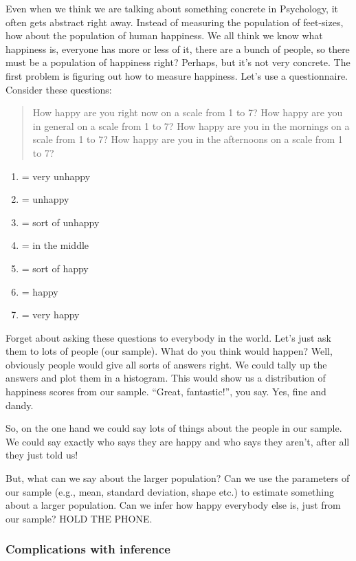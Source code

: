 \documentclass[
  letterpaper,
  DIV=11,
  numbers=noendperiod]{scrreprt}
\providecommand{\tightlist}{%
  \setlength{\itemsep}{0pt}\setlength{\parskip}{0pt}}\usepackage{longtable,booktabs,array}
\begin{document}
Even when we think we are talking about something concrete in
Psychology, it often gets abstract right away. Instead of measuring the
population of feet-sizes, how about the population of human happiness.
We all think we know what happiness is, everyone has more or less of it,
there are a bunch of people, so there must be a population of happiness
right? Perhaps, but it's not very concrete. The first problem is
figuring out how to measure happiness. Let's use a questionnaire.
Consider these questions:

\begin{quote}
How happy are you right now on a scale from 1 to 7? How happy are you in
general on a scale from 1 to 7? How happy are you in the mornings on a
scale from 1 to 7? How happy are you in the afternoons on a scale from 1
to 7?
\end{quote}

\begin{enumerate}
\def\labelenumi{\arabic{enumi}.}
\tightlist
\item
  = very unhappy
\item
  = unhappy
\item
  = sort of unhappy
\item
  = in the middle
\item
  = sort of happy
\item
  = happy
\item
  = very happy
\end{enumerate}

Forget about asking these questions to everybody in the world. Let's
just ask them to lots of people (our sample). What do you think would
happen? Well, obviously people would give all sorts of answers right. We
could tally up the answers and plot them in a histogram. This would show
us a distribution of happiness scores from our sample. ``Great,
fantastic!'', you say. Yes, fine and dandy.

So, on the one hand we could say lots of things about the people in our
sample. We could say exactly who says they are happy and who says they
aren't, after all they just told us!

But, what can we say about the larger population? Can we use the
parameters of our sample (e.g., mean, standard deviation, shape etc.) to
estimate something about a larger population. Can we infer how happy
everybody else is, just from our sample? HOLD THE PHONE.

\subsubsection{Complications with
inference}\label{complications-with-inference}
\end{document}
